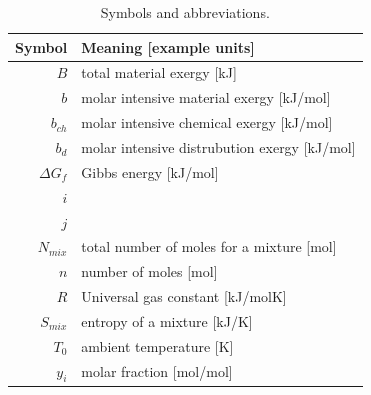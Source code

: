 \documentclass[journal,article,submit,pdftex,moreauthors]{Definitions/mdpi}
\begin{document}
\begin{table}
\footnotesize
\centering %
\caption{Symbols and abbreviations.}
\begin{tabular}{r l}
\toprule
\textbf{Symbol}              & \textbf{Meaning [example units]} \\
\midrule
$B$                 & total material exergy [kJ] \\
$b$                 & molar intensive material exergy [kJ/mol] \\
$b_{ch}$            & molar intensive chemical exergy [kJ/mol] \\
$b_d$               & molar intensive distrubution exergy [kJ/mol] \\
$\Delta{G_{f}}$     & Gibbs energy [kJ/mol] \\
$i$                 & \\
$j$                 & \\
$N_{mix}$           & total number of moles for a mixture [mol] \\
$n$                 & number of moles [mol] \\
$R$                 & Universal gas constant [kJ/molK] \\
$S_{mix}$           & entropy of a mixture [kJ/K] \\
$T_{0}$             & ambient temperature [K] \\
$y_i$               & molar fraction [mol/mol] \\

\bottomrule
\end{tabular}
\label{tab:symbols}
\end{table}





\end{document}
